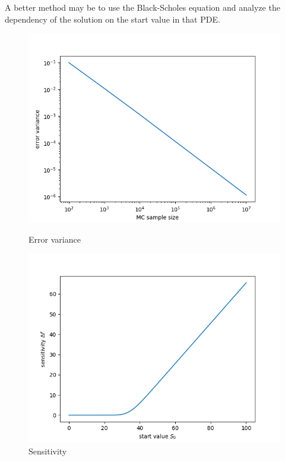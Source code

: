 \documentclass[a4paper,11pt]{scrartcl}
\begin{document}
\begin{enumerate}
\begin{enumerate}[leftmargin=1em]
    A better method may be to use the Black-Scholes equation and analyze the
    dependency of the solution on the start value in that PDE.

\begin{figure}[h]
    \begin{minipage}[b]{.5\linewidth}
      \centering
      \includegraphics[width=\linewidth]{error_var.png}
      \caption{Error variance}
      \label{fig:error_var}
    \end{minipage}%
    \begin{minipage}[b]{.5\linewidth}
      \centering
      \includegraphics[width=\linewidth]{delta_f.png}
      \caption{Sensitivity}
      \label{fig:delta}
    \end{minipage}
\end{figure}


\end{enumerate}
\end{enumerate}
\end{document}
